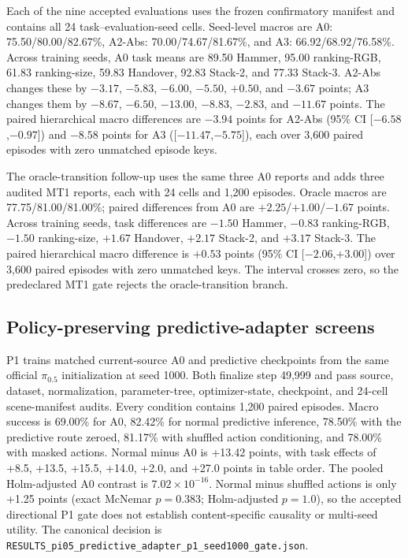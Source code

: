 Each of the nine accepted evaluations uses the frozen confirmatory manifest
and contains all 24 task--evaluation-seed cells.  Seed-level macros are A0:
75.50/80.00/82.67\%, A2-Abs: 70.00/74.67/81.67\%, and A3:
66.92/68.92/76.58\%.  Across training seeds, A0 task means are 89.50 Hammer,
95.00 ranking-RGB, 61.83 ranking-size, 59.83 Handover, 92.83 Stack-2, and 77.33
Stack-3.  A2-Abs changes these by $-3.17$, $-5.83$, $-6.00$, $-5.50$, $+0.50$,
and $-3.67$ points; A3 changes them by $-8.67$, $-6.50$, $-13.00$, $-8.83$,
$-2.83$, and $-11.67$ points.  The paired hierarchical macro differences are
$-3.94$ points for A2-Abs (95\% CI [$-6.58$,$-0.97$]) and $-8.58$ points for A3
([$-11.47$,$-5.75$]), each over 3,600 paired episodes with zero unmatched
episode keys.

The oracle-transition follow-up uses the same three A0 reports and adds three
audited MT1 reports, each with 24 cells and 1,200 episodes.  Oracle macros are
77.75/81.00/81.00\%; paired differences from A0 are
$+2.25$/$+1.00$/$-1.67$ points.  Across training seeds, task differences are
$-1.50$ Hammer, $-0.83$ ranking-RGB, $-1.50$ ranking-size, $+1.67$ Handover,
$+2.17$ Stack-2, and $+3.17$ Stack-3.  The paired hierarchical macro
difference is $+0.53$ points (95\% CI [$-2.06$,$+3.00$]) over 3,600 paired
episodes with zero unmatched keys.  The interval crosses zero, so the
predeclared MT1 gate rejects the oracle-transition branch.

\subsection{Policy-preserving predictive-adapter screens}
P1 trains matched current-source A0 and predictive checkpoints from the same
official $\pi_{0.5}$ initialization at seed 1000.  Both finalize step 49,999
and pass source, dataset, normalization, parameter-tree, optimizer-state,
checkpoint, and 24-cell scene-manifest audits.  Every condition contains 1,200
paired episodes.  Macro success is 69.00\% for A0, 82.42\% for normal
predictive inference, 78.50\% with the predictive route zeroed, 81.17\% with
shuffled action conditioning, and 78.00\% with masked actions.  Normal minus
A0 is +13.42 points, with task effects of +8.5, +13.5, +15.5, +14.0, +2.0,
and +27.0 points in table order.  The pooled Holm-adjusted A0 contrast is
$7.02\!\times\!10^{-16}$.  Normal minus shuffled actions is only +1.25 points
(exact McNemar $p{=}0.383$; Holm-adjusted $p{=}1.0$), so the accepted
directional P1 gate does not establish content-specific causality or
multi-seed utility.  The canonical decision is
\texttt{RESULTS\_pi05\_predictive\_adapter\_p1\_seed1000\_gate.json}.

